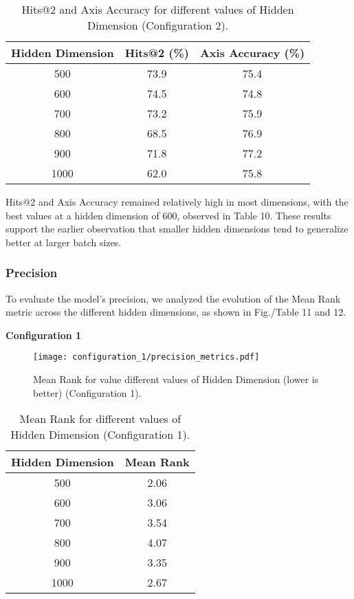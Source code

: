 \begin{table}[h]
\centering
\caption{Hits@2 and Axis Accuracy for different values of Hidden Dimension (Configuration 2).}
\begin{tabular}{|c|c|c|}
\hline
Hidden Dimension & Hits@2 (\%) & Axis Accuracy (\%)\\
\hline
500  & 73.9 & 75.4\\
600  & 74.5 & 74.8\\
700  & 73.2 & 75.9\\
800  & 68.5 & 76.9\\
900  & 71.8 & 77.2\\
1000  & 62.0 & 75.8\\
\hline
\end{tabular}
\label{tab:accuracy_metrics_table_c2}
\end{table}
Hits@2 and Axis Accuracy remained relatively high in most dimensions, with the best values at a hidden dimension of 600, observed in Table 10. These results support the earlier observation that smaller hidden dimensions tend to generalize better at larger batch sizes.

\subsubsection{Precision}
To evaluate the model's precision, we analyzed the evolution of the Mean Rank metric across the different hidden dimensions, as shown in Fig./Table 11 and 12.

\vspace{0.3cm}
\textbf{Configuration 1}
\begin{figure}[H]
    \centering
    \texttt{[image: configuration\_1/precision\_metrics.pdf]}
    \caption{Mean Rank for value different values of Hidden Dimension (lower is better) (Configuration 1).}  
    \label{fig:precision_metrics_c1}               
\end{figure}


\begin{table}[h]
\centering
\caption{Mean Rank for different values of Hidden Dimension (Configuration 1).}
\begin{tabular}{|c|c|}
\hline
Hidden Dimension & Mean Rank \\
\hline
500  & 2.06\\
600  & 3.06\\
700  & 3.54\\
800  & 4.07\\
900  & 3.35\\
1000  & 2.67\\
\hline
\end{tabular}
\label{tab:precision_metrics_table_c1}
\end{table}


